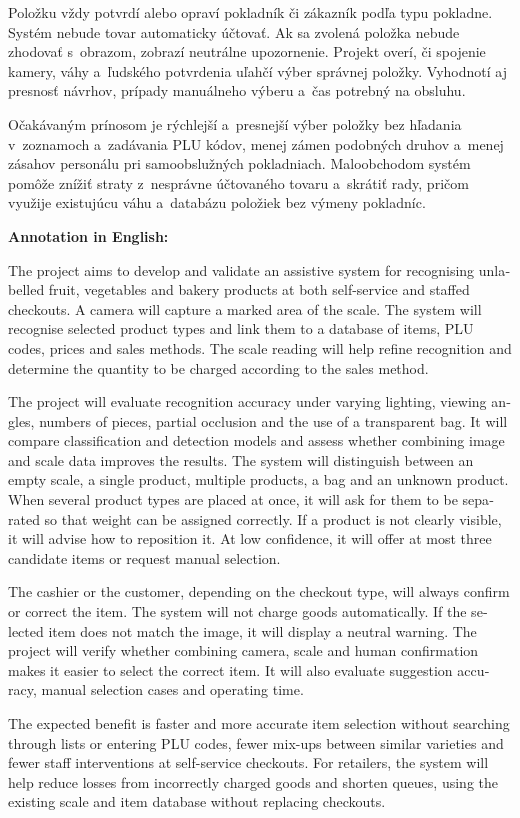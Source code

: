 \documentclass[10pt,a4paper,twocolumn ]{article}
\begin{document}
Položku vždy potvrdí alebo opraví pokladník či zákazník podľa typu pokladne. Systém nebude tovar automaticky účtovať. Ak sa zvolená položka nebude zhodovať s~obrazom, zobrazí neutrálne upozornenie. Projekt overí, či spojenie kamery, váhy a~ľudského potvrdenia uľahčí výber správnej položky. Vyhodnotí aj presnosť návrhov, prípady manuálneho výberu a~čas potrebný na obsluhu.

Očakávaným prínosom je rýchlejší a~presnejší výber položky bez hľadania v~zoznamoch a~zadávania PLU kódov, menej zámen podobných druhov a~menej zásahov personálu pri samoobslužných pokladniach. Maloobchodom systém pomôže znížiť straty z~nesprávne účtovaného tovaru a~skrátiť rady, pričom využije existujúcu váhu a~databázu položiek bez výmeny pokladníc.

\textbf{Annotation in English:}

\begin{otherlanguage}{english}
The project aims to develop and validate an assistive system for recognising unlabelled fruit, vegetables and bakery products at both self-service and staffed checkouts. A camera will capture a marked area of the scale. The system will recognise selected product types and link them to a database of items, PLU codes, prices and sales methods. The scale reading will help refine recognition and determine the quantity to be charged according to the sales method.

The project will evaluate recognition accuracy under varying lighting, viewing angles, numbers of pieces, partial occlusion and the use of a transparent bag. It will compare classification and detection models and assess whether combining image and scale data improves the results. The system will distinguish between an empty scale, a single product, multiple products, a bag and an unknown product. When several product types are placed at once, it will ask for them to be separated so that weight can be assigned correctly. If a product is not clearly visible, it will advise how to reposition it. At low confidence, it will offer at most three candidate items or request manual selection.

The cashier or the customer, depending on the checkout type, will always confirm or correct the item. The system will not charge goods automatically. If the selected item does not match the image, it will display a neutral warning. The project will verify whether combining camera, scale and human confirmation makes it easier to select the correct item. It will also evaluate suggestion accuracy, manual selection cases and operating time.

The expected benefit is faster and more accurate item selection without searching through lists or entering PLU codes, fewer mix-ups between similar varieties and fewer staff interventions at self-service checkouts. For retailers, the system will help reduce losses from incorrectly charged goods and shorten queues, using the existing scale and item database without replacing checkouts.
\end{otherlanguage}
\end{document}
